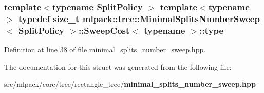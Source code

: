 \subsubsection[{type}]{\setlength{\rightskip}{0pt plus 5cm}template$<$typename Split\+Policy $>$ template$<$typename $>$ typedef size\+\_\+t {\bf mlpack\+::tree\+::\+Minimal\+Splits\+Number\+Sweep}$<$ Split\+Policy $>$\+::{\bf Sweep\+Cost}$<$ typename $>$\+::{\bf type}}\label{structmlpack_1_1tree_1_1MinimalSplitsNumberSweep_1_1SweepCost_ae0e58f95242166a9b4412fd202f8dcaa}


Definition at line 38 of file minimal\+\_\+splits\+\_\+number\+\_\+sweep.\+hpp.



The documentation for this struct was generated from the following file\+:\begin{DoxyCompactItemize}
\item 
src/mlpack/core/tree/rectangle\+\_\+tree/{\bf minimal\+\_\+splits\+\_\+number\+\_\+sweep.\+hpp}\end{DoxyCompactItemize}
